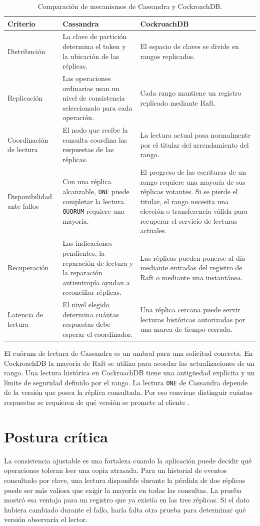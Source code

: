 \documentclass[12pt,a4paper]{article}
\begin{document}
\begin{table}[htbp]
\centering\small
\caption{Comparación de mecanismos de Cassandra y CockroachDB.}
\begin{tabularx}{\linewidth}{@{}p{.20\linewidth}XX@{}}
\toprule
Criterio & Cassandra & CockroachDB \\
\midrule
Distribución & La clave de partición determina el token y la ubicación de las réplicas. & El espacio de claves se divide en rangos replicados. \\
Replicación & Las operaciones ordinarias usan un nivel de consistencia seleccionado para cada operación. & Cada rango mantiene un registro replicado mediante Raft. \\
Coordinación de lectura & El nodo que recibe la consulta coordina las respuestas de las réplicas. & La lectura actual pasa normalmente por el titular del arrendamiento del rango. \\
Disponibilidad ante fallos & Con una réplica alcanzable, \texttt{ONE} puede completar la lectura. \texttt{QUORUM} requiere una mayoría. & El progreso de las escrituras de un rango requiere una mayoría de sus réplicas votantes. Si se pierde el titular, el rango necesita una elección o transferencia válida para recuperar el servicio de lecturas actuales. \\
Recuperación & Las indicaciones pendientes, la reparación de lectura y la reparación antientropía ayudan a reconciliar réplicas. & Las réplicas pueden ponerse al día mediante entradas del registro de Raft o mediante una instantánea. \\
Latencia de lectura & El nivel elegido determina cuántas respuestas debe esperar el coordinador. & Una réplica cercana puede servir lecturas históricas autorizadas por una marca de tiempo cerrada. \\
\bottomrule
\end{tabularx}
\end{table}

El cuórum de lectura de Cassandra es un umbral para una solicitud concreta. En CockroachDB la mayoría de Raft se utiliza para acordar las actualizaciones de un rango. Una lectura histórica en CockroachDB tiene una antigüedad explícita y un límite de seguridad definido por el rango. La lectura \texttt{ONE} de Cassandra depende de la versión que posea la réplica consultada. Por eso conviene distinguir cuántas respuestas se requieren de qué versión se promete al cliente \cite{cassandraDynamo,cockroachRaft,cockroachReads}.

\section{Postura crítica}
La consistencia ajustable es una fortaleza cuando la aplicación puede decidir qué operaciones toleran leer una copia atrasada. Para un historial de eventos consultado por clave, una lectura disponible durante la pérdida de dos réplicas puede ser más valiosa que exigir la mayoría en todas las consultas. La prueba mostró esa ventaja para un registro que ya existía en las tres réplicas. Si el dato hubiera cambiado durante el fallo, haría falta otra prueba para determinar qué versión observaría el lector.
\end{document}
